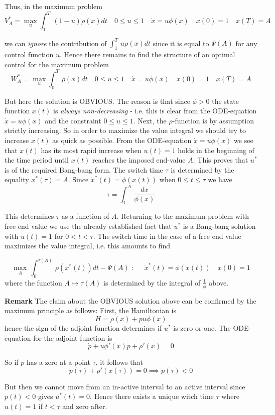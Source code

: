 \documentclass{amsart}
\begin{document}
\noindent
Thus, in the maximum problem
\[
V^*_A=\max_u\int_1^T\,(1- u)\rho(x)dt \quad
0\leq u\leq 1\quad \dot x=u\phi(x)\quad x(0)=1\quad x(T)=A
\]

\noindent 
we can \emph{ignore} the contribution of
$\int_1^T\, u\rho(x)dt$ since it is equal to $\Psi(A)$ for any control function
$u$.
Hence there remains to find the structure of an optimal control for the maximum problem
\[
W^*_A=\max_u\int_0^T\,\rho(x)dt \quad
0\leq u\leq 1\quad \dot x=u\phi(x)\quad x(0)=1\quad x(T)=A
\]
\medskip

\noindent
But here the solution is OBVIOUS. The reason is that since
$\phi>0$ the state function $x(t)$ is \emph{always non-decreasing} - i.e. this is clear from the ODE-equation $\dot x=u\phi(x)$ and the constraint $0\leq u\leq 1$.
Next, the $\rho$-function is by assumption strictly increasing. 
So in order to maximize the value integral we should try to increase 
$x(t)$ as quick as possible.
From the ODE-equation $\dot x=u\phi(x)$ we see that
$x(t)$ has its most rapid increase when $u(t)=1$ holds in
the beginning of the time period until $x(t)$ reaches the imposed end-value $A$.
This proves that $u^*$ is of the required Bang-bang form. The switch time
$\tau$ is determined by the equality $x^*(\tau)=A$. Since 
$\dot x^*(t)=\phi(x(t))$ when $0\leq t\leq\tau$ we have
\[
\tau=\int_1^A\,\frac{dx}{\phi(x)}
\]

\noindent
This determines $\tau$ as a function of $A$. Returning 
to the maximum problem with free end value we use the 
already established fact that $u^*$ is a Bang-bang solution 
with $u(t)=1$ for $0<t<\tau$. The switch time in the case of a free
end value   maximizes the value integral, i.e. 
this amounts to find

\[
\max_A\,\int_0^{\tau(A)}\,\rho(x^\ast(t))dt-\Psi(A)\,\,\colon\,\, \quad
\dot x^*(t)=\phi(x(t))\quad x(0)=1
\]
\noindent where the function $A\mapsto \tau(A)$ is determined by the 
integral of $\frac{1}{\phi}$ above.
\medskip
 
\noindent 
{\bf Remark} 
The claim  about the OBVIOUS solution above can be
confirmed  by the maximum principle as follows:  First, the Hamiltonian is
\[
H=\rho(x)+pu\phi(x)
\]
hence the sign of the adjoint function determines if 
$u^*$ is zero or one.
The ODE-equation for the adjoint
function is
\[
\dot p+u\phi'(x)p+\rho'(x)=0
\]
 
\noindent
So if $p$ has a zero at a point $\tau$, it follows that 
\[
\dot p(\tau)+\rho'(x(\tau))=0\implies \dot p(\tau)<0
\]

\noindent
But then we cannot move from an in-active interval to an active interval
since $p(t)<0$ gives $u^*(t)=0$. Hence there exists a unique witch time
$\tau$ where $u(t)=1$ if $t<\tau$ and zero after.
\end{document}
